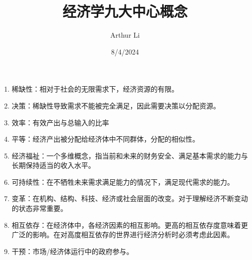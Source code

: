 \documentclass[UTF8]{ctexart}
\title{经济学九大中心概念}
\author{Arthur Li}
\date{8/4/2024}
\begin{document}
\maketitle
\begin{enumerate}
    \item 稀缺性：相对于社会的无限需求下，经济资源的有限。
    \item 决策：稀缺性导致需求不能被完全满足，因此需要决策以分配资源。
    \item 效率：有效产出与总输入的比率
    \item 平等：经济产出被分配给经济体中不同群体，分配的相似性。
    \item 经济福祉：一个多维概念，指当前和未来的财务安全、满足基本需求的能力与长期保持适当的收入水平。
    \item 可持续性：在不牺牲未来需求满足能力的情况下，满足现代需求的能力。
    \item 变革：在机构、结构、科技、经济或社会层面的改变。对于理解经济不断变动的状态非常重要。
    \item 相互依存：在经济体中，各经济因素的相互影响。更高的相互依存度意味着更广泛的影响。在对高度相互依存的世界进行经济分析时必须考虑此因素。
    \item 干预：市场/经济体运行中的政府参与。
\end{enumerate}
\end{document}
